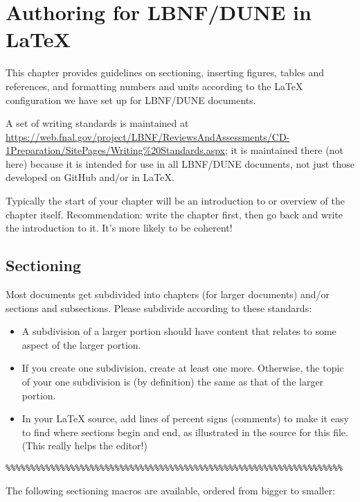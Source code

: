 
\chapter{Authoring for LBNF/DUNE in \LaTeX}
\label{ch:authoring}

This chapter provides guidelines on sectioning,  inserting figures, tables and references, and formatting numbers and units according to the \LaTeX{} configuration we have set up for LBNF/DUNE documents.

A set of writing standards is maintained at \url{https://web.fnal.gov/project/LBNF/ReviewsAndAssessments/CD-1Preparation/SitePages/Writing%20Standards.aspx};
it is maintained there (not here) because it is intended for use in all LBNF/DUNE documents, not just those developed on GitHub and/or in \LaTeX{}.

Typically the start of your chapter will be an introduction to or overview of the chapter itself. Recommendation: write the chapter first, then go back and write the introduction to it. It's more likely to be coherent!

\section{Sectioning}
\label{sec:sectioning}

Most documents get subdivided into chapters (for larger documents) and/or sections and subsections. Please subdivide according to these standards:

\begin{itemize}
\item A subdivision of a larger portion should have content that relates to some aspect of the larger portion. 
\item  If you create one subdivision, create at least one more. Otherwise, the topic of your one subdivision is (by definition) the same as that of the larger portion.
\item In your \LaTeX{} source, add lines of percent signs (comments) to make it easy to find where sections begin and end, as illustrated in the source for this file. (This really helps the editor!)
\end{itemize}

\begin{verbatim}
%%%%%%%%%%%%%%%%%%%%%%%%%%%%%%%%%%%%%%%%%%%%%%%%%%%%%%%%%%%%%%%%%%%%
\end{verbatim}

The following sectioning macros are available, ordered from bigger to smaller:

